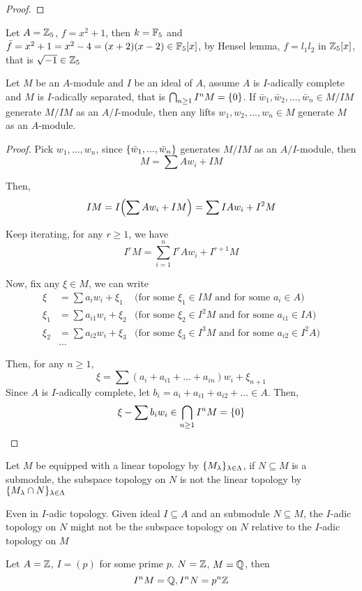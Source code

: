 \begin{proof}
\end{proof}

\begin{remark}
	Let $A = \mathbb{Z}_5$, $f = x^2 + 1$, then $k = \mathbb{F}_5$ and $\bar{f} = x^2 + 1 = x^2 - 4 = (x+2)(x-2) \in \mathbb{F}_5[x]$, by Hensel lemma, $f = l_1 l_2$ in $\mathbb{Z}_5[x]$, that is $\sqrt{-1} \in \mathbb{Z}_5$
\end{remark}

\begin{theorem}
	Let $M$ be an $A$-module and $I$ be an ideal of $A$, assume $A$ is $I$-adically complete and $M$ is $I$-adically separated, that is $\bigcap_{n \geq 1} I^n M = \{0\}$. If $\bar{w}_1, \bar{w}_2, ..., \bar{w}_n \in M / IM$ generate $M / IM$ as an $A/I$-module, then any lifts $w_1, w_2, ..., w_n \in M$ generate $M$ as an $A$-module.
\end{theorem}

\begin{proof}
	Pick $w_1, ..., w_n$, since $\{\bar{w}_1, ..., \bar{w}_n\}$ generates $M / IM$ as an $A/I$-module, then
	$$
		M = \sum A w_i + IM
	$$
	
	Then,
	$$
		IM = I \tuple*{\sum A w_i + IM} = \sum I A w_i + I^2 M
	$$
	
	Keep iterating, for any $r \geq 1$, we have
	$$
		 I^r M = \sum_{i=1}^n I^r A w_i + I^{r+1} M
	$$
	
	Now, fix any $\xi \in M$, we can write
	\begin{align*}
		\xi &= \sum a_i w_i + \xi_1 &\text{(for some $\xi_1 \in IM$ and for some $a_i \in A$)}\\
		\xi_1 &= \sum a_{i 1} w_i + \xi_2 &\text{(for some $\xi_2 \in I^2 M$ and for some $a_{i 1} \in I A$)}\\
		\xi_2 &= \sum a_{i 2} w_i + \xi_3 &\text{(for some $\xi_3 \in I^3 M$ and for some $a_{i 2} \in I^2 A$)}\\
		&...
	\end{align*}
	
	Then, for any $n \geq 1$,
	$$
		\xi = \sum (a_i + a_{i1} + ... + a_{in}) w_i + \xi_{n+1}
	$$
	Since $A$ is $I$-adically complete, let $b_i = a_i + a_{i 1} + a_{i 2} + ... \in A$. Then, 
	$$
		\xi - \sum b_i w_i \in \bigcap_{n \geq 1} I^n M = \{0\}
	$$
\end{proof}

\begin{remark}
	Let $M$ be equipped with a linear topology by $\{M_\lambda\}_{\lambda \in \Lambda}$, if $N \subseteq M$ is a submodule, the subspace topology on $N$ is not the linear topology by $\{M_\lambda \cap N\}_{\lambda \in \Lambda}$
	
	Even in $I$-adic topology. Given ideal $I \subseteq A$ and an submodule $N \subseteq M$, the $I$-adic topology on $N$ might not be the subspace topology on $N$ relative to the $I$-adic topology on $M$
	
	Let $A = \mathbb{Z}$, $I = (p)$ for some prime $p$. $N = \mathbb{Z}$, $M = \mathbb{Q}$, then 
	$$
		I^n M = \mathbb{Q}, I^n N = p^n \mathbb{Z}
	$$
\end{remark}


